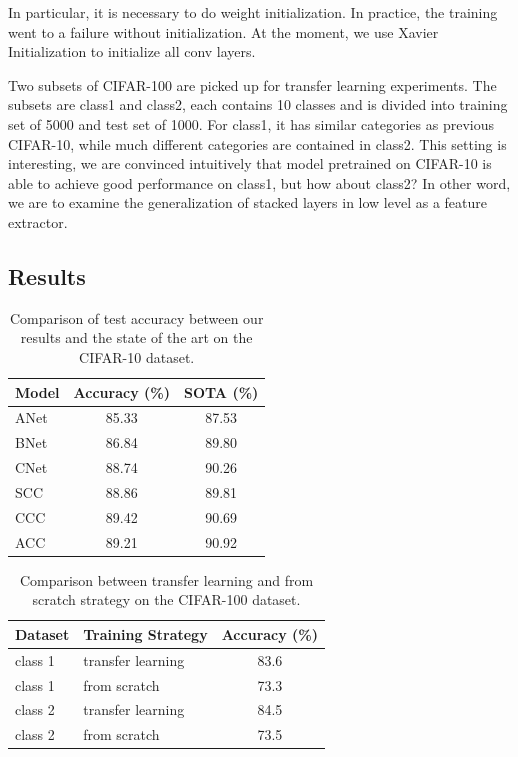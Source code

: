\documentclass[10pt,twocolumn,letterpaper]{article}
\begin{document}
    In particular, it is necessary to do weight initialization. In practice, the training went to a failure without initialization. At the moment, we use Xavier Initialization to initialize all conv layers.

    
    Two subsets of CIFAR-100 are picked up for transfer learning experiments. The subsets are class1 and class2, each contains 10 classes and is divided into training set of 5000 and test set of 1000. For class1, it has similar categories as previous CIFAR-10, while much different categories are contained in class2. This setting is interesting, we are convinced intuitively that model pretrained on CIFAR-10 is able to achieve good performance on class1, but how about class2? In other word, we are to examine the generalization of stacked layers in low level as a feature extractor.

    \subsection{Results}

        \begin{table}[]
            \begin{tabular}{lcc}
            \hline
            Model & Accuracy (\%) & SOTA (\%) \\
            \hline
            ANet  & 85.33         & 87.53     \\
            BNet  & 86.84         & 89.80     \\
            CNet  & 88.74         & 90.26     \\
            SCC   & 88.86         & 89.81     \\
            CCC   & 89.42         & 90.69     \\
            ACC   & 89.21         & 90.92     \\
            \hline
            \end{tabular}
            \caption{Comparison of test accuracy between our results and the state of the art on the CIFAR-10 dataset.}
            \label{tab: t1}
            \end{table}
            
            
            \begin{table}[]
            \begin{tabular}{llc}
            \hline
            Dataset & Training Strategy & Accuracy (\%) \\
            \hline
            class 1 & transfer learning & 83.6          \\
            class 1 & from scratch      & 73.3          \\
            class 2 & transfer learning & 84.5          \\
            class 2 & from scratch      & 73.5          \\
            \hline
            \end{tabular}
            \caption{Comparison between transfer learning and from scratch strategy on the CIFAR-100 dataset.}
            \label{tab: t2}
            \end{table}
\end{document}
